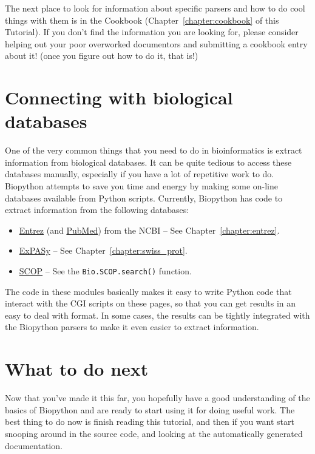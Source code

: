 \documentclass{report}
\begin{document}
The next place to look for information about specific parsers and how to do cool things with them is in the Cookbook (Chapter~\ref{chapter:cookbook} of this Tutorial). If you don't find the information you are looking for, please consider helping out your poor overworked documentors and submitting a cookbook entry about it! (once you figure out how to do it, that is!)

\section{Connecting with biological databases}
\label{sec:connecting-with-biological-databases}

One of the very common things that you need to do in bioinformatics is extract information from biological databases. It can be quite tedious to access these databases manually, especially if you have a lot of repetitive work to do. Biopython attempts to save you time and energy by making some on-line databases available from Python scripts. Currently, Biopython has code to extract information from the following databases:

\begin{itemize}
  \item \href{http://www.ncbi.nlm.nih.gov/Entrez/}{Entrez} (and \href{http://www.ncbi.nlm.nih.gov/PubMed/}{PubMed}) from the NCBI -- See Chapter~\ref{chapter:entrez}.
  \item \href{http://www.expasy.org/}{ExPASy} -- See Chapter~\ref{chapter:swiss_prot}.
  \item \href{http://scop.mrc-lmb.cam.ac.uk/scop/}{SCOP} -- See the \verb|Bio.SCOP.search()| function.
\end{itemize}

The code in these modules basically makes it easy to write Python code that interact with the CGI scripts on these pages, so that you can get results in an easy to deal with format. In some cases, the results can be tightly integrated with the Biopython parsers to make it even easier to extract information.

\section{What to do next}

Now that you've made it this far, you hopefully have a good understanding of the basics of Biopython and are ready to start using it for doing useful work. The best thing to do now is finish reading this tutorial, and then if you want start snooping around in the source code, and looking at the automatically generated documentation.
\end{document}
